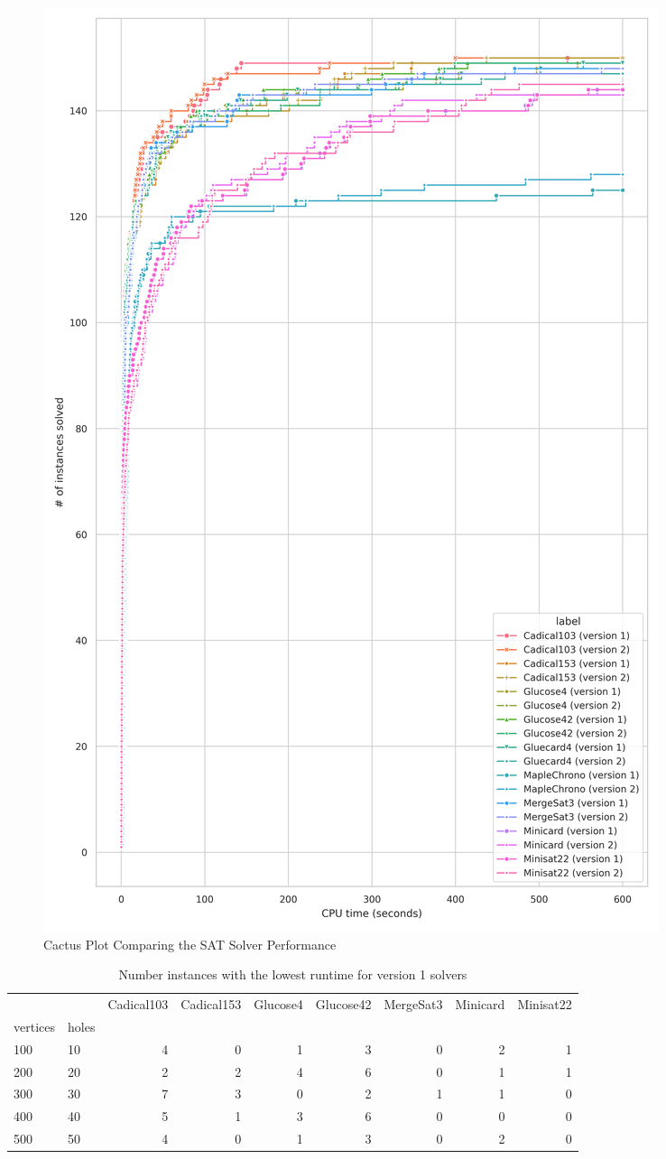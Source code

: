 \begin{figure}[htbp]
\centering
\includegraphics[scale=0.7]{Thesis/figures/minibenchmark_cactus_plot_runtime_SAT_with_holes.png}
\caption{Cactus Plot Comparing the SAT Solver Performance}
\label{fig:cactus_SAT}
\end{figure}

\begin{table}[]
\centering
\begin{tabular}{llrrrrrrr}
\toprule
 &  & Cadical103 & Cadical153 & Glucose4 & Glucose42 & MergeSat3 & Minicard & Minisat22 \\
vertices & holes &  &  &  &  &  &  &  \\
\midrule
100 & 10 & 4 & 0 & 1 & 3 & 0 & 2 & 1 \\
\cline{1-9}
200 & 20 & 2 & 2 & 4 & 6 & 0 & 1 & 1 \\
\cline{1-9}
300 & 30 & 7 & 3 & 0 & 2 & 1 & 1 & 0 \\
\cline{1-9}
400 & 40 & 5 & 1 & 3 & 6 & 0 & 0 & 0 \\
\cline{1-9}
500 & 50 & 4 & 0 & 1 & 3 & 0 & 2 & 0 \\
\cline{1-9}
\bottomrule
\end{tabular}
\caption{Number instances with the lowest runtime for version 1 solvers}
\label{tab:SAT_small_time_v2}
\end{table}

